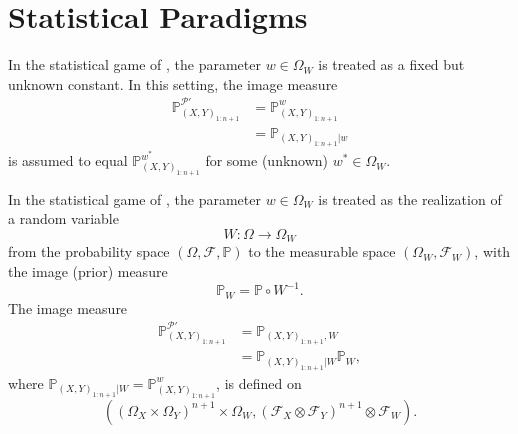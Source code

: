 \chapter{Statistical Paradigms}
\label{chp:statistical_paradigms}
\begin{axiom}
	\label{ax:parameter_fixed}
	In the statistical game of , the parameter $w \in \Omega_W$ is treated as a fixed but unknown constant. In this setting, the image measure 
	\begin{equation}
		\begin{split}
			\mathbb{P}_{(X,Y)_{1\colon n+1}}^{\mathcal{P}'} &= \mathbb{P}_{(X,Y)_{1:n+1}}^w\\
			& =  \mathbb{P}_{(X,Y)_{1:n+1}|w}
		\end{split}
	\end{equation}
	is assumed to equal $\mathbb{P}_{(X,Y)_{1:n+1}}^{w^*}$ for some (unknown) $w^* \in \Omega_W$.
\end{axiom}

\begin{axiom}
	\label{ax:parameter_variable}
	In the statistical game of , the parameter $w \in \Omega_W$ is treated as the realization of a random variable
	\begin{equation}
		W\colon\Omega \to \Omega_W
	\end{equation}
	from the probability space $(\Omega, \mathcal{F}, \mathbb{P})$ to the measurable space $(\Omega_W, \mathcal{F}_W)$, with the image (prior) measure
	\begin{equation}
		\mathbb{P}_{W} = \mathbb{P} \circ W^{-1}.
	\end{equation}
	The image measure 
	\begin{equation}
		\begin{split}
			\mathbb{P}_{(X,Y)_{1\colon n+1}}^{\mathcal{P}'} & = \mathbb{P}_{(X,Y)_{1:n+1},W} \\
			&= \mathbb{P}_{(X,Y)_{1:n+1}|W}\mathbb{P}_{W},
		\end{split}
	\end{equation}
	where $\mathbb{P}_{(X,Y)_{1:n+1}|W}=\mathbb{P}_{(X,Y)_{1:n+1}}^w$, is defined on 
	\begin{equation}
		((\Omega_X \times \Omega_Y)^{n+1}\times \Omega_W, (\mathcal{F}_X \otimes \mathcal{F}_Y)^{n+1}\otimes \mathcal{F}_W ).
	\end{equation}
\end{axiom}

